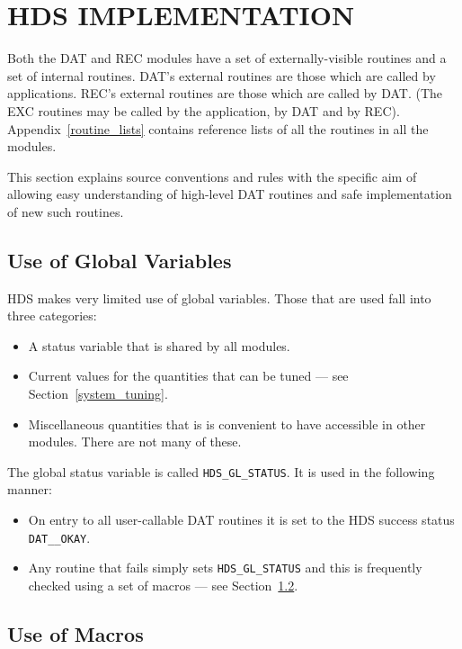 \section {HDS IMPLEMENTATION}

Both the DAT and REC modules have a set of externally-visible routines and a set
of internal routines. DAT's external routines are those which are called by
applications. REC's external routines are those which are called by DAT. (The
EXC routines may be called by the application, by DAT and by REC).
Appendix~\ref{routine_lists} contains reference lists of all the routines
in all the modules.

This section explains source conventions and rules with the specific aim of
allowing easy understanding of high-level DAT routines and safe implementation
of new such routines. 

\subsection {Use of Global Variables}
\label {use_of_global_variables}

HDS makes very limited use of global variables. Those that are used fall
into three categories:

\begin {itemize}
\item A status variable that is shared by all modules.
\item Current values for the quantities that can be tuned --- see
Section~\ref{system_tuning}.
\item Miscellaneous quantities that is is convenient to have accessible
in other modules. There are not many of these.
\end {itemize}

The global status variable is called {\tt HDS\_GL\_STATUS}. It is used in
the following manner:

\begin {itemize}
\item On entry to all user-callable DAT routines it is set to the HDS success
status {\tt DAT\_\_OKAY}.
\item Any routine that fails simply sets {\tt HDS\_GL\_STATUS} and this
is frequently checked using a set of macros --- see
Section~\ref{use_of_macros}.
\end {itemize}
 
\subsection {Use of Macros}
\label {use_of_macros}

